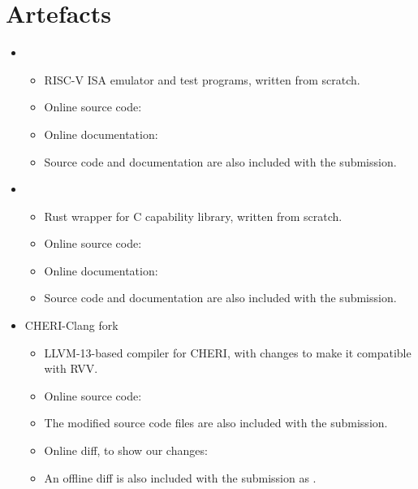 \chapter{Artefacts}\label{appx:artefacts}

\begin{itemize}
    \item[] 
    \begin{itemize}
        \item[] RISC-V ISA emulator and test programs, written from scratch.
        \item[] Online source code: 
        \item[] Online documentation: 
        \item[] Source code and documentation are also included with the submission.
    \end{itemize}
    \item[] 
    \begin{itemize}
        \item[] Rust wrapper for C capability library, written from scratch.
        \item[] Online source code: 
        \item[] Online documentation: 
        \item[] Source code and documentation are also included with the submission.
    \end{itemize}
    \item[] CHERI-Clang fork
    \begin{itemize}
        \item[] LLVM-13-based compiler for CHERI, with changes to make it compatible with RVV.
        \item[] Online source code: 
        \item[] The modified source code files are also included with the submission.
        \item[] Online diff, to show our changes: 
        \item[] An offline diff is also included with the submission as .
    \end{itemize}
\end{itemize}